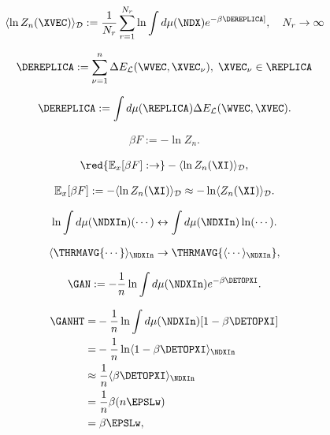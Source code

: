 \begin{align}
  \label{eqn:logZreplica}
  \langle \ln Z_{n}(\XVEC) \rangle_{\mathcal{D}}
  :=
  \dfrac{1}{N_r}\sum_{r=1}^{N_r}\ln\int d\mu(\NDX) e^{-\beta \DEREPLICA]},
  \quad  %
  N_r\rightarrow\infty
\end{align}

\begin{align}
\DEREPLICA:=\sum_{\nu=1}^{n}\Delta E_{\mathcal{L}}(\WVEC,\XVEC_{\nu}),
\;
\XVEC_{\nu}\in\REPLICA
\end{align}

\begin{align}
\DEREPLICA:=\int d\mu(\REPLICA)\Delta E_{\mathcal{L}}(\WVEC,\XVEC)  .
\end{align}

\begin{align}
\label{eqn:F}
\beta F:=-\ln Z_{n}.
\end{align}

\begin{align}
  \red{\mathbb{E}_{x}[\beta F]:\rightarrow}-\langle \ln Z_{n}(\XI)\rangle_{\mathcal{D}},
\end{align}

\begin{align}
\label{eqn:AA}
\mathbb{E}_{x}[\beta F]:=-\langle\ln Z_{n}(\XI)\rangle_{\mathcal{D}}\approx-\ln \langle Z_{n}(\XI)\rangle_{\mathcal{D}}.
\end{align}

\begin{align}
\label{eqn:Jensens}
\ln\int d\mu(\NDXIn)(\cdots)\leftrightarrow \int d\mu(\NDXIn)\ln(\cdots)   .
\end{align}

\begin{align}
 \label{eqn:switch}
\langle\THRMAVG{\cdots}\rangle_{\NDXIn}\rightarrow\THRMAVG{\langle\cdots\rangle_{\NDXIn}}   ,
\end{align}

\begin{align}
   \label{eqn:Gan_def}
   \GAN:= - \frac{1}{n}\ln  \int d\mu(\NDXIn)e^{-\beta\DETOPXI}.
  \end{align}

\begin{align}
\label{eqn:Gan_highT}
\GANHT
=&  - \frac{1}{n}\ln \int d\mu(\NDXIn) [1-\beta \DETOPXI] \\ \nonumber
=&  - \frac{1}{n}\ln\langle 1-\beta\DETOPXI \rangle_{\NDXIn} \\ \nonumber
\approx&\;  \frac{1}{n}\langle \beta\DETOPXI \rangle_{\NDXIn} \\ \nonumber
=&\;\frac{1}{n}\beta (n\EPSLw)\\ \nonumber
=&\;\beta \EPSLw  ,
\end{align}

